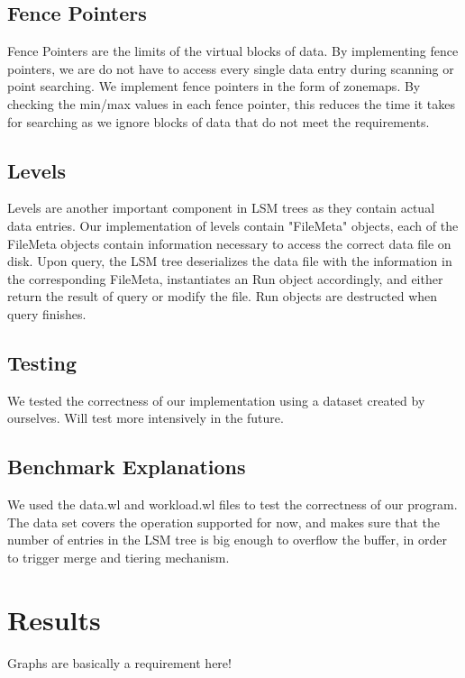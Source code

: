 \documentclass[sigconf]{acmart}
\begin{document}
    \subsection{Fence Pointers}
    Fence Pointers are the limits of the virtual blocks of data. By implementing fence pointers, we are do not have to access every single data entry during scanning or point searching. We implement fence pointers in the form of zonemaps. By checking the min/max values in each fence pointer, this reduces the time it takes for searching as we ignore blocks of data that do not meet the requirements.

    \subsection{Levels}
    Levels are another important component in LSM trees as they contain actual data entries. Our implementation of levels contain "FileMeta" objects, each of the FileMeta objects contain information necessary to access the correct data file on disk. Upon query, the LSM tree deserializes the data file with the information in the corresponding FileMeta, instantiates an Run object accordingly, and either return the result of query or modify the file. Run objects are destructed when query finishes.

    \subsection{Testing}
    We tested the correctness of our implementation using a dataset created by ourselves. Will test more intensively in the future.

    \subsection{Benchmark Explanations}

    We used the data.wl and workload.wl files to test the correctness of our program. The data set covers the operation supported for now, and makes sure that the number of entries in the LSM tree is big enough to overflow the buffer, in order to trigger merge and tiering mechanism.


    \section{Results}
    Graphs are basically a requirement here!
\end{document}
